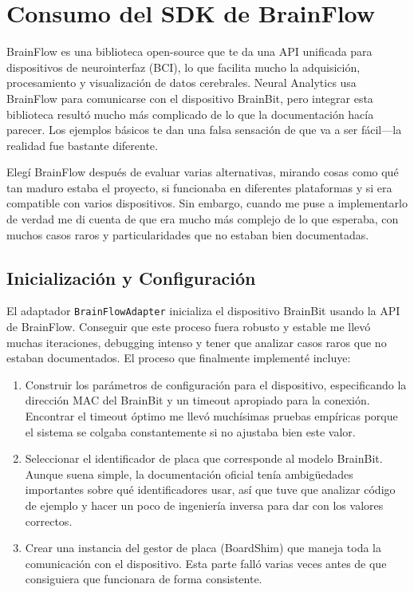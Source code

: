 \section{Consumo del SDK de BrainFlow}

BrainFlow es una biblioteca open-source que te da una API unificada para dispositivos de neurointerfaz (BCI), lo que facilita mucho la adquisición, procesamiento y visualización de datos cerebrales. Neural Analytics usa BrainFlow para comunicarse con el dispositivo BrainBit, pero integrar esta biblioteca resultó mucho más complicado de lo que la documentación hacía parecer. Los ejemplos básicos te dan una falsa sensación de que va a ser fácil—la realidad fue bastante diferente.

Elegí BrainFlow después de evaluar varias alternativas, mirando cosas como qué tan maduro estaba el proyecto, si funcionaba en diferentes plataformas y si era compatible con varios dispositivos. Sin embargo, cuando me puse a implementarlo de verdad me di cuenta de que era mucho más complejo de lo que esperaba, con muchos casos raros y particularidades que no estaban bien documentadas.

\subsection{Inicialización y Configuración}

El adaptador \texttt{BrainFlowAdapter} inicializa el dispositivo BrainBit usando la API de BrainFlow. Conseguir que este proceso fuera robusto y estable me llevó muchas iteraciones, debugging intenso y tener que analizar casos raros que no estaban documentados. El proceso que finalmente implementé incluye:

\begin{enumerate}
    \item Construir los parámetros de configuración para el dispositivo, especificando la dirección MAC del BrainBit y un timeout apropiado para la conexión. Encontrar el timeout óptimo me llevó muchísimas pruebas empíricas porque el sistema se colgaba constantemente si no ajustaba bien este valor.
    \item Seleccionar el identificador de placa que corresponde al modelo BrainBit. Aunque suena simple, la documentación oficial tenía ambigüedades importantes sobre qué identificadores usar, así que tuve que analizar código de ejemplo y hacer un poco de ingeniería inversa para dar con los valores correctos.
    \item Crear una instancia del gestor de placa (BoardShim) que maneja toda la comunicación con el dispositivo. Esta parte falló varias veces antes de que consiguiera que funcionara de forma consistente.
\end{enumerate}

